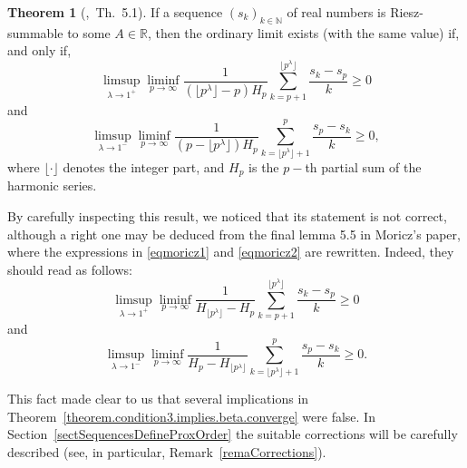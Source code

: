 \documentclass[11pt,a4paper]{article}
\theoremstyle{definition}
\newtheorem{theo}{Theorem}[section]
\def\oo{\infty}
\def\ri{\rightarrow}
\def\N{\mathbb{N}}
\def\R{\mathbb{R}}
\begin{document}
\begin{theo}[\cite{Moricz},\ Th.\ 5.1]\label{theoMoricz}
If a sequence $(s_k)_{k\in\N}$ of real numbers is Riesz-summable to some $A\in\R$, then the ordinary limit exists (with the same value) if, and only if,
\begin{equation}\label{eqmoricz1}
 \limsup_{\lambda\ri1^+}\liminf_{p\ri\oo} \frac{1}{(\lfloor p^\lambda\rfloor-p)H_p}\sum_{k=p+1}^{\lfloor p^\lambda\rfloor}\frac{s_k-s_p}{k}\geq 0
\end{equation}
and
\begin{equation}\label{eqmoricz2}
 \limsup_{\lambda\ri1^-}\liminf_{p\ri\oo} \frac{1}{(p-\lfloor p^\lambda\rfloor )H_p}\sum^{p}_{k= \lfloor p^\lambda\rfloor+1}\frac{s_p-s_k}{k}\geq 0,
\end{equation}
where $\lfloor \cdot \rfloor$ denotes the integer part, and $H_p$ is the $p-$th partial sum of the harmonic series.

\end{theo}

By carefully inspecting this result, we noticed that its statement is not correct, although a right one may be deduced from the final lemma 5.5 in Moricz's paper, where the expressions in \eqref{eqmoricz1} and \eqref{eqmoricz2} are rewritten. Indeed, they should read as follows:
\begin{equation*}
 \limsup_{\lambda\ri1^+}\liminf_{p\ri\oo} \frac{1}{H_{\lfloor p^\lambda\rfloor}-H_p}\sum_{k=p+1}^{\lfloor p^\lambda\rfloor}\frac{s_k-s_p}{k}\geq 0
\end{equation*}
and
\begin{equation*}
 \limsup_{\lambda\ri1^-}\liminf_{p\ri\oo} \frac{1}{H_p-H_{\lfloor p^\lambda\rfloor}}\sum^{p}_{k= \lfloor p^\lambda\rfloor+1}\frac{s_p-s_k}{k}\geq 0.
\end{equation*}

This fact made clear to us that several implications in Theorem~\ref{theorem.condition3.implies.beta.converge} were false. In Section~\ref{sectSequencesDefineProxOrder} the suitable corrections will be carefully described (see, in particular, Remark~\ref{remaCorrections}).
\end{document}
